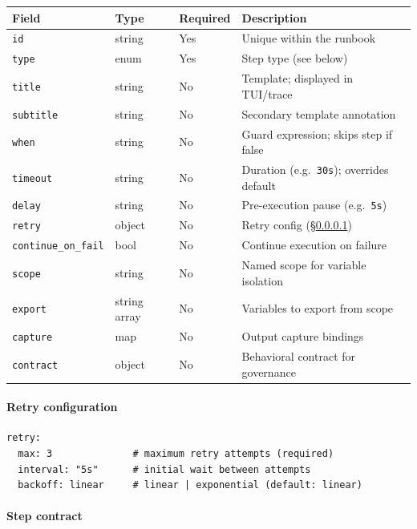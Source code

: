 \begin{center}
\begin{tabular}{lllp{5.5cm}}
\hline
\textbf{Field} & \textbf{Type} & \textbf{Required} & \textbf{Description} \\
\hline
\texttt{id}              & string  & Yes & Unique within the runbook \\
\texttt{type}            & enum    & Yes & Step type (see below) \\
\texttt{title}           & string  & No  & Template; displayed in TUI/trace \\
\texttt{subtitle}        & string  & No  & Secondary template annotation \\
\texttt{when}            & string  & No  & Guard expression; skips step if false \\
\texttt{timeout}         & string  & No  & Duration (e.g.\ \texttt{30s}); overrides default \\
\texttt{delay}           & string  & No  & Pre-execution pause (e.g.\ \texttt{5s}) \\
\texttt{retry}           & object  & No  & Retry config (\S\ref{subsec:retry}) \\
\texttt{continue\_on\_fail} & bool & No  & Continue execution on failure \\
\texttt{scope}           & string  & No  & Named scope for variable isolation \\
\texttt{export}          & string array & No & Variables to export from scope \\
\texttt{capture}         & map     & No  & Output capture bindings \\
\texttt{contract}        & object  & No  & Behavioral contract for governance \\
\hline
\end{tabular}
\end{center}

\paragraph{Retry configuration}
\label{subsec:retry}

\begin{verbatim}
retry:
  max: 3              # maximum retry attempts (required)
  interval: "5s"      # initial wait between attempts
  backoff: linear     # linear | exponential (default: linear)
\end{verbatim}

\paragraph{Step contract}

